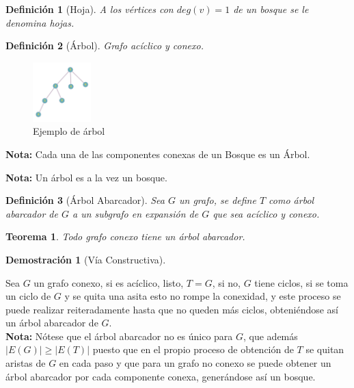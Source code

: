 \documentclass[a4paper,1pt]{report}
\newtheorem*{teo}{Teorema}
\newtheorem*{dem}{Demostración}
\newtheorem*{dfn}{Definición}
\begin{document}
\begin{dfn}[Hoja]
A los v\'ertices con $deg(v) = 1$ de un bosque se le denomina hojas.
\end{dfn}

\begin{dfn}[\'Arbol]
    Grafo ac\'iclico y conexo. 
\end{dfn}
\begin{figure}[H]
    \centering
    \includegraphics[width=0.2\textwidth]{figures2/arbol.png}
    \caption{Ejemplo de \'arbol}
\end{figure}

\textbf{Nota:} Cada una de las componentes conexas de un Bosque es un \'Arbol.

\textbf{Nota:} Un \'arbol es a la vez un bosque.

\begin{dfn}[\'Arbol Abarcador]
    Sea $G$ un grafo, se define $T$ como \'arbol abarcador de $G$ a un subgrafo en expansi\'on de $G$ que sea ac\'iclico y conexo.
\end{dfn}

\begin{teo}
    Todo grafo conexo tiene un \'arbol abarcador.
\end{teo}

\begin{dem}[V\'ia Constructiva]\end{dem}
Sea $G$ un grafo conexo, si es ac\'iclico, listo, $T = G$, si no, $G$ tiene ciclos, si se toma un ciclo de $G$ y se quita una asita esto no rompe la conexidad, y este proceso se puede realizar reiteradamente hasta que no queden m\'as ciclos, obteni\'endose as\'i un \'arbol abarcador de $G$.\\


\textbf{Nota:} N\'otese que el \'arbol abarcador no es \'unico para $G$, que adem\'as $|E(G)| \geq |E(T)|$ puesto que en el propio proceso de obtenci\'on de $T$ se quitan aristas de $G$ en cada paso y que para un grafo no conexo se puede obtener un \'arbol abarcador por cada componente conexa, gener\'andose as\'i un bosque.
\end{document}
